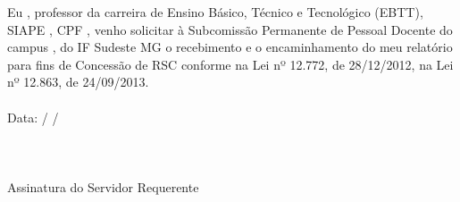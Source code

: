 Eu \textbf{\underline{\the\nomeservidor}}, professor\expandafter\ifstrequal\expandafter{\the\genero}{feminino}{a}{} da carreira de Ensino Básico, Técnico e Tecnológico (EBTT), SIAPE \textbf{\underline{\the\siape}}, CPF \textbf{\underline{\the\cpf}}, venho solicitar à Subcomissão Permanente de Pessoal Docente do campus \textbf{\underline{\the\campus}}, do IF Sudeste MG o recebimento e o encaminhamento do meu relatório para fins de Concessão de RSC conforme na Lei nº 12.772, de 28/12/2012, na Lei nº 12.863, de 24/09/2013.
\\
\\
Data: \underline{\hspace{0.3in}} / \underline{\hspace{0.3in}} / \underline{\hspace{0.3in}}
\\
\\
\\
\underline{\hspace{5in}}\\
Assinatura do Servidor Requerente


